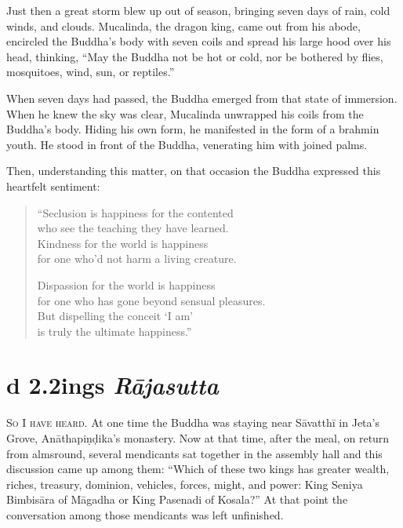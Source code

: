 \documentclass[12pt,openany]{book}%
\newcommand*{\suttatitleacronym}[1]{\smaller[2]{#1}\vspace*{.3em}}
\newcommand*{\suttatitletranslation}[1]{\linebreak{#1}}
\newcommand*{\suttatitleroot}[1]{\linebreak\smaller[2]\itshape{#1}}
\newcommand*{\tocacronym}[1]{\hspace*{-3.3em}{#1}\quad}
\newcommand*{\toctranslation}[1]{#1}
\newcommand*{\tocroot}[1]{(\textit{#1})}
\newcommand*{\scevam}[1]{\textsc{#1}}
\begin{document}
Just then a great storm blew up out of season, bringing seven days of rain, cold winds, and clouds. Mucalinda, the dragon king, came out from his abode, encircled the Buddha’s body with seven coils and spread his large hood over his head, thinking, “May the Buddha not be hot or cold, nor be bothered by flies, mosquitoes, wind, sun, or reptiles.” 

When seven days had passed, the Buddha emerged from that state of immersion. When he knew the sky was clear, Mucalinda unwrapped his coils from the Buddha’s body. Hiding his own form, he manifested in the form of a brahmin youth. He stood in front of the Buddha, venerating him with joined palms. 

Then, understanding this matter, on that occasion the Buddha expressed this heartfelt sentiment: 

\begin{verse}%
“Seclusion is happiness for the contented \\
who see the teaching they have learned. \\
Kindness for the world is happiness \\
for one who’d not harm a living creature. 

Dispassion for the world is happiness \\
for one who has gone beyond sensual pleasures. \\
But dispelling the conceit ‘I am’ \\
is truly the ultimate happiness.” 

%
\end{verse}

%
\section*{{\suttatitleacronym Ud 2.2}{\suttatitletranslation Kings }{\suttatitleroot Rājasutta}}
\addcontentsline{toc}{section}{\tocacronym{Ud 2.2} \toctranslation{Kings } \tocroot{Rājasutta}}

\scevam{So I have heard. }At one time the Buddha was staying near \textsanskrit{Sāvatthī} in Jeta’s Grove, \textsanskrit{Anāthapiṇḍika}’s monastery. Now at that time, after the meal, on return from almsround, several mendicants sat together in the assembly hall and this discussion came up among them: “Which of these two kings has greater wealth, riches, treasury, dominion, vehicles, forces, might, and power: King Seniya \textsanskrit{Bimbisāra} of \textsanskrit{Māgadha} or King Pasenadi of Kosala?” At that point the conversation among those mendicants was left unfinished. 
\end{document}
